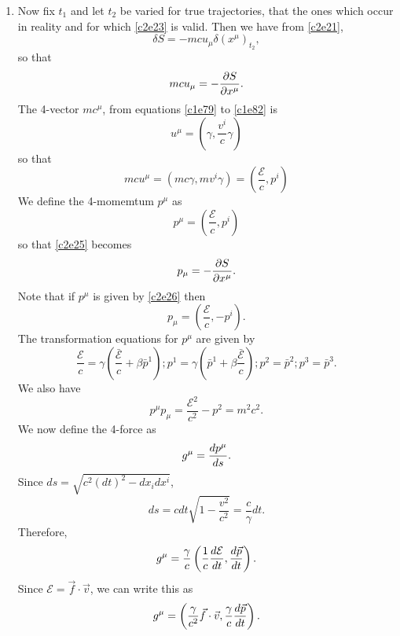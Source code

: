 \begin{enumerate}
\item Now fix $t_1$ and let $t_2$ be varied for true trajectories, that the ones
which occur in reality and for which \eqref{c2e23} is valid. Then we have from
\eqref{c2e21},
\begin{equation}\label{c2e24}
\delta S = -mcu_\mu \delta (x^\mu)_{t_2},
\end{equation}
so that
\begin{equation}\label{c2e25}
mcu_\mu = -\frac{\partial{S}}{\partial{x^\mu}}.
\end{equation}
The 4-vector $mc^\mu$, from equations \eqref{c1e79} to \eqref{c1e82} is
\[
u^\mu = \left(\gamma, \frac{v^i}{c}\gamma\right)
\]
so that
\[
mcu^\mu = \left(mc\gamma, mv^i\gamma\right) = \left(\frac{\mathcal{E}}{c}, p^i\right)
\]
We define the 4-momemtum $p^\mu$ as
\begin{equation}\label{c2e26}
p^\mu = \left(\frac{\mathcal{E}}{c}, p^i\right)
\end{equation}
so that \eqref{c2e25} becomes
\begin{equation}\label{c2e27}
p_\mu = -\frac{\partial{S}}{\partial{x^\mu}}.
\end{equation}
Note that if $p^\mu$ is given by \eqref{c2e26} then
\begin{equation}\label{c2e28}
p_\mu = \left(\frac{\mathcal{E}}{c}, -p^i\right).
\end{equation}
The transformation equations for $p^\mu$ are given by
\begin{equation}\label{c2e29}
\frac{\mathcal{E}}{c} = \gamma\left(\frac{\bar{\mathcal{E}}}{c} + \beta\bar{p}^1\right);
p^1 = \gamma\left(\bar{p}^1 + \beta\frac{\bar{\mathcal{E}}}{c}\right); p^2 = \bar{p}^2;
p^3 = \bar{p}^3.
\end{equation}
We also have
\begin{equation}\label{c2e30}
p^\mu p_\mu = \frac{\mathcal{E}^2}{c^2} - p^2 = m^2c^2.
\end{equation}
We now define the 4-force as 
\begin{equation}\label{c2e31}
g^\mu = \frac{d{p^\mu}}{d{s}}.
\end{equation}
Since $ds = \sqrt{c^2(dt)^2 - dx_i dx^i}$,
\begin{equation}\label{c2e32}
ds = cdt\sqrt{1 - \frac{v^2}{c^2}} = \frac{c}{\gamma}dt.
\end{equation}
Therefore,
\[
g^\mu = \frac{\gamma}{c}\left(\frac{1}{c}\frac{d{\mathcal{E}}}{d{t}}, \frac{d{\vec{p}}}{d{t}}\right).
\]
Since $\mathcal{E} = \vec{f}\cdot\vec{v}$, we can write this as
\begin{equation}\label{c2e33}
g^\mu = \left(\frac{\gamma}{c^2}\vec{f}\cdot\vec{v}, \frac{\gamma}{c}\frac{d{\vec{p}}}{d{t}}\right).
\end{equation}


\end{enumerate}
